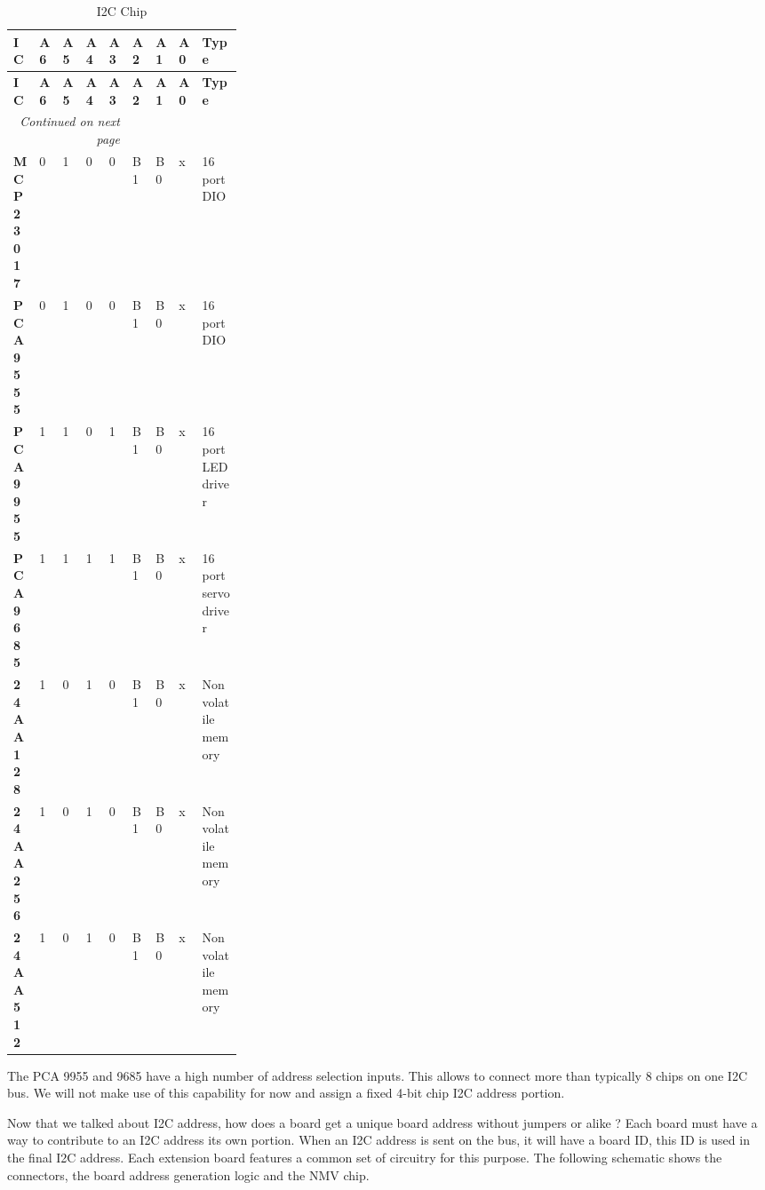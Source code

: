 \begin{longtable}{@{}|l|l|l|l|l|l|l|l|p{0.3\linewidth}|@{}}
    \caption{I2C Chip} \\
    \toprule
    \textbf{IC} & \textbf{A6} & \textbf{A5} & \textbf{A4} & \textbf{A3} & \textbf{A2} & \textbf{A1} & \textbf{A0} & \textbf{Type} \\
    \midrule
    \endfirsthead
    \toprule
    \textbf{IC} & \textbf{A6} & \textbf{A5} & \textbf{A4} & \textbf{A3} & \textbf{A2} & \textbf{A1} & \textbf{A0} & \textbf{Type} \\
    \midrule
    \endhead
    \midrule
    \multicolumn{5}{r}{\textit{Continued on next page}} \\
    \midrule
    \endfoot
    \bottomrule
    \endlastfoot
    \textbf{MCP23017} & 0 & 1 & 0 & 0 & B1 & B0 & x & 16 port DIO \\
    \midrule
    \textbf{PCA9555} & 0 & 1 & 0 & 0 & B1 & B0 & x & 16 port DIO \\
    \midrule
    \textbf{PCA9955} & 1 & 1 & 0 & 1 & B1 & B0 & x & 16 port LED driver \\
    \midrule
    \textbf{PCA9685} & 1 & 1 & 1 & 1 & B1 & B0 & x & 16 port servo driver \\
    \midrule
    \textbf{24AA128} & 1 & 0 & 1 & 0 & B1 & B0 & x & Non volatile memory \\
    \midrule
    \textbf{24AA256} & 1 & 0 & 1 & 0 & B1 & B0 & x & Non volatile memory \\
    \midrule
    \textbf{24AA512} & 1 & 0 & 1 & 0 & B1 & B0 & x & Non volatile memory \\
\end{longtable}

The PCA 9955 and 9685 have a high number of address selection inputs. This allows to connect more than typically 8 chips on one I2C bus. We will not make use of this capability for now and assign a fixed 4-bit chip I2C address portion.


Now that we talked about I2C address, how does a board get a unique board address without jumpers or alike ? Each board must have a way to contribute to an I2C address its own portion. When an I2C address is sent on the bus, it will have a board ID, this ID is used in the final I2C address. Each extension board features a common set of circuitry for this purpose. The following schematic shows the connectors, the board address generation logic and the NMV chip.

